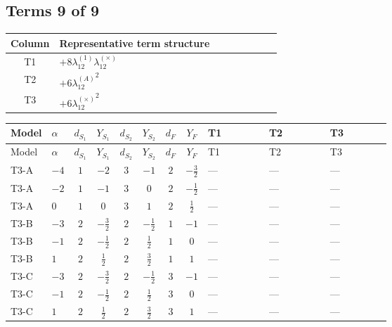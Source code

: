 \documentclass[8pt]{article}
\begin{document}
\begin{landscape}
\subsection*{Terms 9 of 9}
\begin{center}
\begin{tabular}{@{}c >{\raggedright\arraybackslash}p{0.82\linewidth}@{}}
\toprule
Column & Representative term structure \\
\midrule
T1 & \(\displaystyle +8 {\lambda_{12}^{(1)}} {\lambda_{12}^{(\times)}}\) \\
\midrule
T2 & \(\displaystyle +6 {\lambda_{12}^{(A)}}^2\) \\
\midrule
T3 & \(\displaystyle +6 {\lambda_{12}^{(\times)}}^2\) \\
\midrule
\bottomrule
\end{tabular}
\end{center}
\smallskip
\tiny
\begin{longtable}{@{}llcccccc >{\raggedright\arraybackslash}p{0.21\linewidth} >{\raggedright\arraybackslash}p{0.21\linewidth} >{\raggedright\arraybackslash}p{0.21\linewidth}@{}}
\toprule
Model & $\alpha$ & $d_{S_1}$ & $Y_{S_1}$ & $d_{S_2}$ & $Y_{S_2}$ & $d_F$ & $Y_F$ & T1 & T2 & T3 \\
\midrule
\endfirsthead
\toprule
Model & $\alpha$ & $d_{S_1}$ & $Y_{S_1}$ & $d_{S_2}$ & $Y_{S_2}$ & $d_F$ & $Y_F$ & T1 & T2 & T3 \\
\midrule
\endhead
T3-A & $-4$ & $1$ & $-2$ & $3$ & $-1$ & $2$ & $-\frac{3}{2}$ & --- & --- & --- \\
\midrule
T3-A & $-2$ & $1$ & $-1$ & $3$ & $0$ & $2$ & $-\frac{1}{2}$ & --- & --- & --- \\
\midrule
T3-A & $0$ & $1$ & $0$ & $3$ & $1$ & $2$ & $\frac{1}{2}$ & --- & --- & --- \\
\midrule
T3-B & $-3$ & $2$ & $-\frac{3}{2}$ & $2$ & $-\frac{1}{2}$ & $1$ & $-1$ & --- & --- & --- \\
\midrule
T3-B & $-1$ & $2$ & $-\frac{1}{2}$ & $2$ & $\frac{1}{2}$ & $1$ & $0$ & --- & --- & --- \\
\midrule
T3-B & $1$ & $2$ & $\frac{1}{2}$ & $2$ & $\frac{3}{2}$ & $1$ & $1$ & --- & --- & --- \\
\midrule
T3-C & $-3$ & $2$ & $-\frac{3}{2}$ & $2$ & $-\frac{1}{2}$ & $3$ & $-1$ & --- & --- & --- \\
\midrule
T3-C & $-1$ & $2$ & $-\frac{1}{2}$ & $2$ & $\frac{1}{2}$ & $3$ & $0$ & --- & --- & --- \\
\midrule
T3-C & $1$ & $2$ & $\frac{1}{2}$ & $2$ & $\frac{3}{2}$ & $3$ & $1$ & --- & --- & --- \\

\end{longtable}
\end{landscape}
\end{document}
